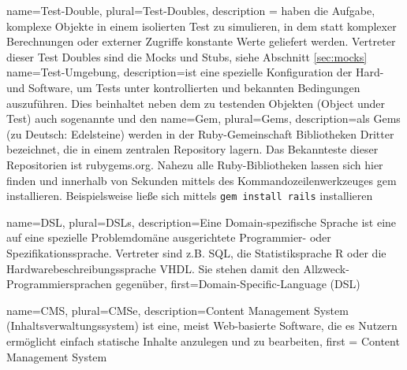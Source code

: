 
 {
  name={Test-Double},
  plural={Test-Doubles},
  description = {haben die Aufgabe, komplexe Objekte in einem isolierten Test zu simulieren, in dem statt komplexer Berechnungen oder externer Zugriffe konstante Werte geliefert werden. Vertreter dieser Test Doubles sind die Mocks und Stubs, siehe Abschnitt
 \ref{sec:mocks}}
}
 {
  name={Test-Umgebung},
  description={ist eine spezielle Konfiguration der Hard- und Software, um Tests unter kontrollierten und bekannten Bedingungen auszuführen. Dies beinhaltet neben dem zu testenden Objekten (Object under Test) auch sogenannte  und den }
}
 {
  name={Gem},
  plural={Gems},
  description={als Gems (zu Deutsch: Edelsteine) werden in der Ruby-Gemeinschaft Bibliotheken Dritter bezeichnet, die in einem zentralen Repository lagern. Das Bekannteste dieser Repositorien ist rubygems.org. Nahezu alle Ruby-Bibliotheken lassen sich hier finden und innerhalb von Sekunden mittels des Kommandozeilenwerkzeuges gem installieren. Beispielsweise ließe sich  mittels \texttt{gem install rails} installieren}
}

 {
  name={DSL},
  plural={DSLs},
  description={Eine Domain-spezifische Sprache ist eine auf eine spezielle Problemdomäne ausgerichtete Programmier- oder Spezifikationssprache. Vertreter sind z.B. SQL, die Statistiksprache R oder die Hardwarebeschreibungssprache VHDL. Sie stehen damit den Allzweck-Programmiersprachen gegenüber},
  first={Domain-Specific-Language (DSL)}
}


 {
  name={CMS},
  plural={CMSe},
  description={Content Management System (Inhaltsverwaltungssystem) ist eine, meist Web-basierte Software, die es Nutzern ermöglicht einfach statische Inhalte anzulegen und zu bearbeiten},
first = {Content Management System}
}

\renewcommand{\glossarypreamble}{Im Folgenden werden einige oft verwendete Begriffe näher erläutert. Innerhalb des Hauptteils dieser Arbeit sind diese Begriffe mit einem $^\uparrow$ gekennzeichnet.}


